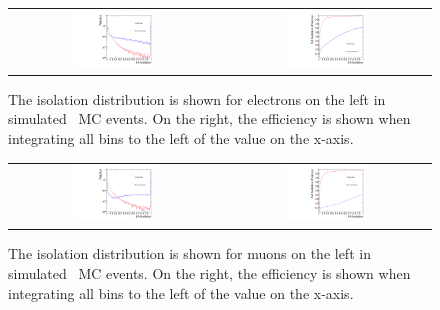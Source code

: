 \begin{figure}[!ht]
\begin{center}
\begin{tabular}{cc}
\includegraphics[width=0.4\textwidth]{evtsel/figs/EA_iso_el.pdf} & 
\includegraphics[width=0.4\textwidth]{evtsel/figs/EA_iso_el_inclusive.pdf} \\
\end{tabular}
\caption{
  The isolation distribution is shown for electrons on the left in simulated \zjets\ MC events.
  On the right, the efficiency is shown when integrating all bins to the left of the value on the x-axis.
\label{fig:isoels}
}
\end{center}
\end{figure}

\begin{figure}[!ht]
\begin{center}
\begin{tabular}{cc}
\includegraphics[width=0.4\textwidth]{evtsel/figs/EA_iso_mu.pdf} & 
\includegraphics[width=0.4\textwidth]{evtsel/figs/EA_iso_mu_inclusive.pdf} \\
\end{tabular}
\caption{
  The isolation distribution is shown for muons on the left in simulated \zjets\ MC events.
  On the right, the efficiency is shown when integrating all bins to the left of the value on the x-axis.
\label{fig:isomus}
}
\end{center}
\end{figure}

